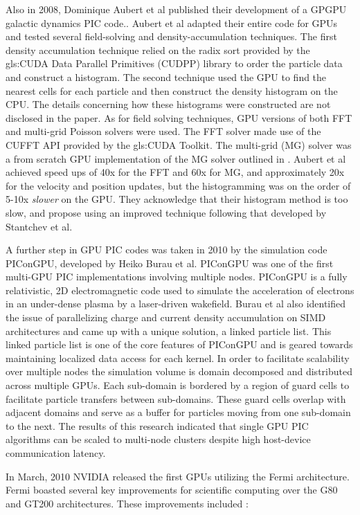 Also in 2008, Dominique Aubert et al published their development of a GPGPU galactic dynamics PIC code.\cite{Aubert2009}. Aubert et al adapted their entire code for GPUs and tested several field-solving and density-accumulation techniques. The first density accumulation technique relied on the radix sort provided by the \gls{gls:CUDA} Data Parallel Primitives (CUDPP) library to order the particle data and construct a histogram. The second technique used the GPU to find the nearest cells for each particle and then construct the density histogram on the CPU. The details concerning how these histograms were constructed are not disclosed in the paper. As for field solving techniques, GPU versions of both FFT and multi-grid Poisson solvers were used. The FFT solver made use of the CUFFT API provided by the \gls{gls:CUDA} Toolkit. The multi-grid (MG) solver was a from scratch GPU implementation of the MG solver outlined in \cite{NumericalRecipes}. Aubert et al achieved speed ups of 40x for the FFT and 60x for MG, and approximately 20x for the velocity and position updates, but the histogramming was on the order of 5-10x \emph{slower} on the GPU. They acknowledge that their histogram method is too slow, and propose using an improved technique following that developed by Stantchev et al.

A further step in GPU PIC codes was taken in 2010 by the simulation code PIConGPU\cite{Burau2010}, developed by Heiko Burau et al. PIConGPU was one of the first multi-GPU PIC implementations involving multiple nodes. PIConGPU is a fully relativistic, 2D electromagnetic code used to simulate the acceleration of electrons in an under-dense plasma by a laser-driven wakefield. Burau et al also identified the issue of parallelizing charge and current density accumulation on SIMD architectures and came up with a unique solution, a linked particle list. This linked particle list is one of the core features of PIConGPU and is geared towards maintaining localized data access for each kernel. In order to facilitate scalability over multiple nodes the simulation volume is domain decomposed and distributed across multiple GPUs. Each sub-domain is bordered by a region of guard cells to facilitate particle transfers between sub-domains. These guard cells overlap with adjacent domains and serve as a buffer for particles moving from one sub-domain to the next. The results of this research indicated that single GPU PIC algorithms can be scaled to multi-node clusters despite high host-device communication latency.

In March, 2010 NVIDIA released the first GPUs utilizing the Fermi architecture. Fermi boasted several key improvements for scientific computing over the G80 and GT200 architectures. These improvements included \cite{NVIDIACorporation2009}:

